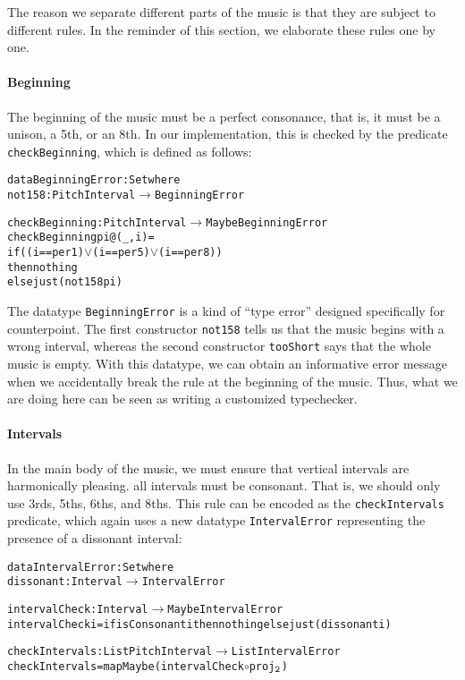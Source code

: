 The reason we separate different parts of the music is that they are
subject to different rules.
In the reminder of this section, we elaborate these rules one by one.

\paragraph{Beginning}
The beginning of the music must be a perfect consonance,
that is, it must be a unison, a 5th, or an 8th.
In our implementation, this is checked by the predicate
\texttt{checkBeginning}, which is defined as follows:

\begin{alltt}
data BeginningError : Set where
  not158   : PitchInterval \(\rightarrow\) BeginningError
  
checkBeginning : PitchInterval \(\rightarrow\) Maybe BeginningError
checkBeginning pi@(_ , i) =
  if ((i == per1) \(\vee\) (i == per5) \(\vee\) (i == per8))
  then nothing
  else just (not158 pi)
\end{alltt}

\noindent The datatype \texttt{BeginningError} is a kind of
``type error'' designed specifically for counterpoint.
The first constructor \texttt{not158} tells us that the music
begins with a wrong interval, whereas the second constructor
\texttt{tooShort} says that the whole music is empty.
With this datatype, we can obtain an informative error message
when we accidentally break the rule at the beginning of the music.
Thus, what we are doing here can be seen as writing a
customized typechecker.

\paragraph{Intervals}
In the main body of the music, we must ensure that vertical intervals
are harmonically pleasing.
all intervals must be consonant.
That is, we should only use 3rds, 5ths, 6ths, and 8ths.
This rule can be encoded as the \texttt{checkIntervals} predicate,
which again uses a new datatype \texttt{IntervalError} representing
the presence of a dissonant interval:

\begin{alltt}
data IntervalError : Set where
  dissonant : Interval \(\rightarrow\) IntervalError

intervalCheck : Interval \(\rightarrow\) Maybe IntervalError
intervalCheck i = if isConsonant i then nothing else just (dissonant i)

checkIntervals : List PitchInterval \(\rightarrow\) List IntervalError
checkIntervals = mapMaybe (intervalCheck \(\circ\) proj\(\sb{\mathtt{2}}\))
\end{alltt}

